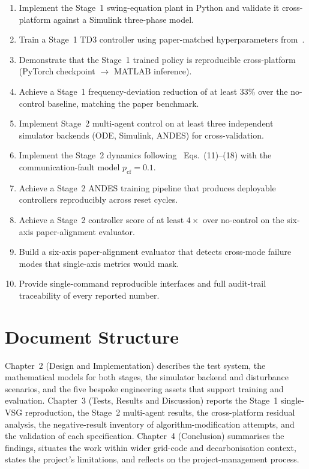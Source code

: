 \documentclass{unnc-fyp}
\begin{document}
\begin{enumerate}
  \item[\textbf{S1}]
    Implement the Stage~1 swing-equation plant in Python and
    validate it cross-platform against a Simulink three-phase
    model.
  \item[\textbf{S2}]
    Train a Stage~1 TD3 controller using paper-matched
    hyperparameters from~\cite{benhmidouch2024td3}.
  \item[\textbf{S3}]
    Demonstrate that the Stage~1 trained policy is reproducible
    cross-platform (PyTorch checkpoint $\rightarrow$ MATLAB
    inference).
  \item[\textbf{S4}]
    Achieve a Stage~1 frequency-deviation reduction of at least
    $33\%$ over the no-control baseline, matching the paper
    benchmark.
  \item[\textbf{S5}]
    Implement Stage~2 multi-agent control on at least three
    independent simulator backends (ODE, Simulink, ANDES) for
    cross-validation.
  \item[\textbf{S6}]
    Implement the Stage~2 dynamics following~\cite{yang2023ddic}
    Eqs.~(11)--(18) with the communication-fault model
    $p_{\mathrm{cf}} = 0.1$.
  \item[\textbf{S7}]
    Achieve a Stage~2 ANDES training pipeline that produces
    deployable controllers reproducibly across reset cycles.
  \item[\textbf{S8}]
    Achieve a Stage~2 controller score of at least $4\times$
    over no-control on the six-axis paper-alignment evaluator.
  \item[\textbf{S9}]
    Build a six-axis paper-alignment evaluator that detects
    cross-mode failure modes that single-axis metrics would
    mask.
  \item[\textbf{S10}]
    Provide single-command reproducible interfaces and full
    audit-trail traceability of every reported number.
\end{enumerate}

\section{Document Structure}

Chapter~2 (Design and Implementation) describes the test system,
the mathematical models for both stages, the simulator backend
and disturbance scenarios, and the five bespoke engineering
assets that support training and evaluation.
Chapter~3 (Tests, Results and Discussion) reports the Stage~1
single-VSG reproduction, the Stage~2 multi-agent results, the
cross-platform residual analysis, the negative-result inventory
of algorithm-modification attempts, and the validation of each
specification.
Chapter~4 (Conclusion) summarises the findings, situates the work
within wider grid-code and decarbonisation context, states the
project's limitations, and reflects on the project-management
process.
\end{document}
